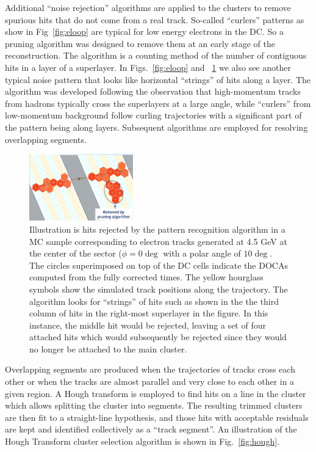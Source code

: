 Additional ``noise rejection'' algorithms are applied to the clusters to remove spurious hits
that do not come from a real track. 
So-called ``curlers'' patterns as show in Fig~\ref{fig:eloop} are typical for low energy electrons  in the DC.   So a pruning algorithm was designed to remove them at an early stage of the reconstruction. The  algorithm is a counting method of the number of contiguous hits in a layer of a superlayer.  In Figs.~\ref{fig:eloop} and ~\ref{fig:strings} we also see another typical noise pattern that looks like horizontal ``strings'' of hits along a layer.  The algorithm was developed following  the observation that high-momentum tracks from hadrons typically cross the superlayers at a large angle,
while ``curlers'' from low-momentum background follow curling trajectories with a significant part of the
pattern being along layers.
Subsequent algorithms  are employed for resolving overlapping segments.   
\begin{figure}
\centering
\includegraphics[width=0.4\textwidth]{pics/dcPattern2.png}
\caption{
Illustration is hits rejected by the pattern recognition algorithm in a MC sample corresponding to electron tracks generated at 4.5 GeV at the center of the sector ($\phi = 0\deg$ with a polar angle of $10\deg$. 
The circles superimposed on top of the DC cells indicate the DOCAs computed from the fully corrected times.  The yellow hourglass symbols show the simulated track positions along the trajectory.   
The algorithm looks for ``strings'' of hits such as shown in the the third column of hits in the right-most superlayer in the figure.  
In this instance, the middle hit would be rejected, leaving a set of four attached hits which would subsequently be rejected since they would no longer be attached to the main cluster. 
}
\label{fig:strings}
\end{figure}


Overlapping segments are produced when the trajectories of tracks cross each other
or when the tracks are almost parallel and very close to each other in a given region.
A Hough transform is employed to find hits on a line in the cluster which allows splitting the cluster into
segments.  The resulting trimmed clusters are then fit to a straight-line hypothesis, and those hits with
acceptable residuals are kept and identified collectively as a ``track segment''. An illustration of the Hough Transform cluster selection algorithm is shown in Fig.~\ref{fig:hough}.

